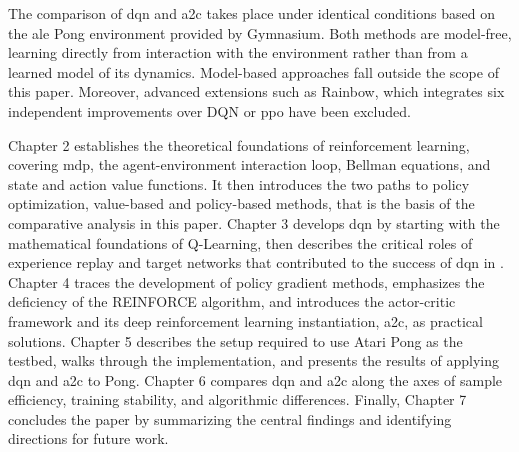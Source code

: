 The comparison of \acrshort{dqn} and \acrshort{a2c} takes place under identical conditions based on the \acrshort{ale} Pong environment provided by Gymnasium. Both methods are model-free, learning directly from interaction with the environment rather than from a learned model of its dynamics. Model-based approaches fall outside the scope of this paper. Moreover, advanced extensions such as Rainbow, which integrates six independent improvements over DQN \citep{hesselRainbowCombiningImprovements2017} or \acrfull{ppo} \citep{schulmanProximalPolicyOptimization2017} have been excluded.

Chapter 2 establishes the theoretical foundations of reinforcement learning, covering \acrfull{mdp}, the agent-environment interaction loop, Bellman equations, and state and action value functions. It then introduces the two paths to policy optimization, value-based and policy-based methods, that is the basis of the comparative analysis in this paper. Chapter 3 develops \acrshort{dqn} by starting with the mathematical foundations of Q-Learning, then describes the critical roles of experience replay and target networks that contributed to the success of \acrshort{dqn} in \citet{mnihHumanlevelControlDeep2015}. Chapter 4 traces the development of policy gradient methods, emphasizes the deficiency of the REINFORCE algorithm, and introduces the actor-critic framework and its deep reinforcement learning instantiation, \acrshort{a2c}, as practical solutions. Chapter 5 describes the setup required to use Atari Pong as the testbed, walks through the implementation, and presents the results of applying \acrshort{dqn} and \acrshort{a2c} to Pong. Chapter 6 compares \acrshort{dqn} and \acrshort{a2c} along the axes of sample efficiency, training stability, and algorithmic differences. Finally, Chapter 7 concludes the paper by summarizing the central findings and identifying directions for future work.